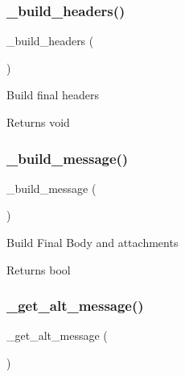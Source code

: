 \subsubsection{\texorpdfstring{\+\_\+build\+\_\+headers()}{\_build\_headers()}}
{\footnotesize\ttfamily \+\_\+build\+\_\+headers (\begin{DoxyParamCaption}{ }\end{DoxyParamCaption})\hspace{0.3cm}{\ttfamily [protected]}}

Build final headers

\begin{DoxyReturn}{Returns}
void 
\end{DoxyReturn}
\mbox{\label{class_c_i___email_a9ddc60e529eb909ff0879781a6f296ff}} 
\subsubsection{\texorpdfstring{\+\_\+build\+\_\+message()}{\_build\_message()}}
{\footnotesize\ttfamily \+\_\+build\+\_\+message (\begin{DoxyParamCaption}{ }\end{DoxyParamCaption})\hspace{0.3cm}{\ttfamily [protected]}}

Build Final Body and attachments

\begin{DoxyReturn}{Returns}
bool 
\end{DoxyReturn}
\mbox{\label{class_c_i___email_a1a87461e94ab7466b7b6f22682c4a055}} 
\subsubsection{\texorpdfstring{\+\_\+get\+\_\+alt\+\_\+message()}{\_get\_alt\_message()}}
{\footnotesize\ttfamily \+\_\+get\+\_\+alt\+\_\+message (\begin{DoxyParamCaption}{ }\end{DoxyParamCaption})\hspace{0.3cm}{\ttfamily [protected]}}

